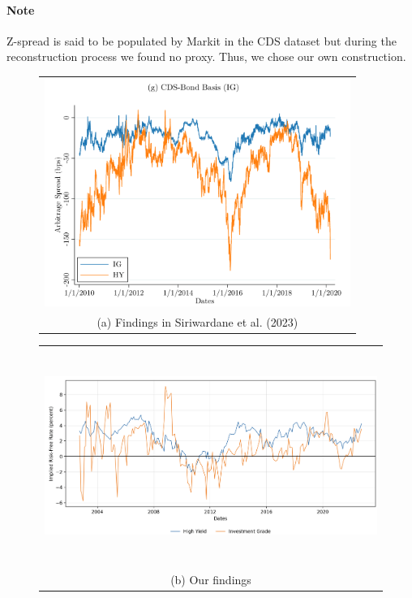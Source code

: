 \documentclass{article}
\begin{document}
\begin{appendices}
\paragraph*{Note}
Z-spread is said to be populated by Markit in the CDS dataset but during the reconstruction process we found no proxy. Thus, we chose our own construction.

\begin{figure}
  \centering
  \begin{tabular}{@{}c@{}}
    \includegraphics[width=.7\linewidth,height=210pt,width=350pt]{../docs_src/SegArb_CDS_Timeseries.png} \\[\abovecaptionskip]
    \small (a) Findings in Siriwardane et al. (2023)
  \end{tabular}

  \vspace{\floatsep}

  \begin{tabular}{@{}c@{}}
    \includegraphics[width=.7\linewidth,height=200pt,width=400pt]{../docs_src/CDS_replicate.png} \\[\abovecaptionskip]
    \small (b) Our findings
  \end{tabular}


\end{figure}
\end{appendices}
\end{document}
